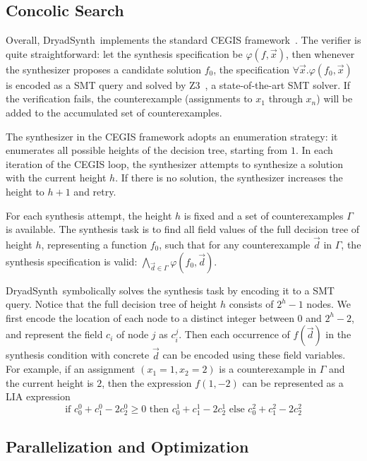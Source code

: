 \documentclass[conference]{IEEEtran}
\newcommand{\DryadSynth}{{\sc DryadSynth~}}
\begin{document}
\subsection*{Concolic Search}

Overall, \DryadSynth implements the standard CEGIS framework~\cite{sketch}. The verifier is quite straightforward: let the synthesis specification be $\varphi(f, \vec{x})$, then whenever the synthesizer proposes a candidate solution $f_0$, the specification $\forall \vec{x}. \varphi(f_0, \vec{x})$ is encoded as a SMT query and solved by Z3~\cite{Z3}, a state-of-the-art SMT solver. If the verification fails, the counterexample (assignments to $x_1$ through $x_n$) will be added to the accumulated set of counterexamples.

The synthesizer in the CEGIS framework adopts an enumeration strategy: it enumerates all possible heights of the decision tree, starting from $1$. In each iteration of the CEGIS loop, the synthesizer attempts to synthesize a solution with the current height $h$. If there is no solution, the synthesizer increases the height to $h+1$ and retry.

For each synthesis attempt, the height $h$ is fixed and a set of counterexamples $\Gamma$ is available. The synthesis task is to find all field values of the full decision tree of height $h$, representing a function $f_0$, such that for any counterexample $\vec{d}$ in $\Gamma$, the synthesis specification is valid: $\displaystyle \bigwedge_{\vec{d} \in \Gamma} \varphi(f_0, \vec{d})$.

\DryadSynth symbolically solves the synthesis task by encoding it to a SMT query. Notice that the full decision tree of height $h$ consists of $2^h - 1$ nodes. We first encode the location of each node to a distinct integer between $0$ and $2^h-2$, and represent the field $c_i$ of node $j$ as $c_i^j$. Then each occurrence of $f(\vec{d})$ in the synthesis condition with concrete $\vec{d}$ can be encoded using these field variables. For example, if an assignment $(x_1 = 1, x_2 = 2)$ is a counterexample in $\Gamma$ and the current height is $2$, then the expression $f(1, -2)$ can be represented as a LIA expression $$\textrm{if~} c_0^0 + c_1^0 - 2c_2^0 \geq 0 \textrm{~then~} c_0^1 + c_1^1 - 2c_2^1 \textrm{~else~} c_0^2 + c_1^2 - 2c_2^2$$

\subsection*{Parallelization and Optimization}
\end{document}
